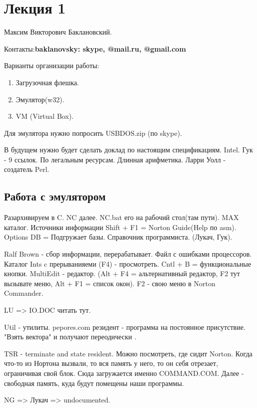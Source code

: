 \section{Лекция 1}
\begin{rem}Максим Викторович Баклановский.\end{rem}
Контакты:\bfseries baklanovsky\mdseries  : skype, @mail.ru, @gmail.com

Варианты организации работы:
\begin{enumerate} 
\item Загрузочная флешка.
\item Эмулятор(w32).
\item VM (Virtual Box).
\end{enumerate}
\begin{rem}Для эмулятора нужно попросить USBDOS.zip (по skype).\end{rem}

\begin{off}В будущем нужно будет сделать доклад по настоящим спецификациям. Intel. Гук - 9 ссылок. По легальным ресурсам. Длинная арифметика. Ларри Уолл - создатель Perl.\end{off}

\subsection{Работа с эмулятором}
Разархивируем в C. NC далее. NC.bat его на рабочий стол(там пути). MAX каталог. 
Источники информации Shift + F1 = Norton Guide(Help по asm).
Options DB = Подгружает базы. Справочник программиста. (Лукач, Гук). 

Ralf Brown - сбор информации, перерабатывает. Файл с ошибками процессоров. Каталог Ints c прерыванияеми (F4) - просмотреть. Cntl + B = функциональные кнопки. MultiEdit - редактор. (Alt + F4 = альтернативный редактор, F2  тут вызывате меню, Alt + F1 = список окон). F2 - свою меню в Norton Commander.

LU => IO.DOC читать тут. 

Util - утилиты. pepores.com резидент - программа на постоянное присутствие. "Взять вектора" и получают переодически . 

TSR - terminate and state resident. Можно посмотреть, где сидит Norton. Когда что-то из Нортона вызвали, то вся память у него, то он себя отрезает, ограничивая свой блок. Сюда загружается именно COMMAND.COM. Далее - свободная память, куда будут помещены наши программы.  

NG => Лукач => undocumented. 

